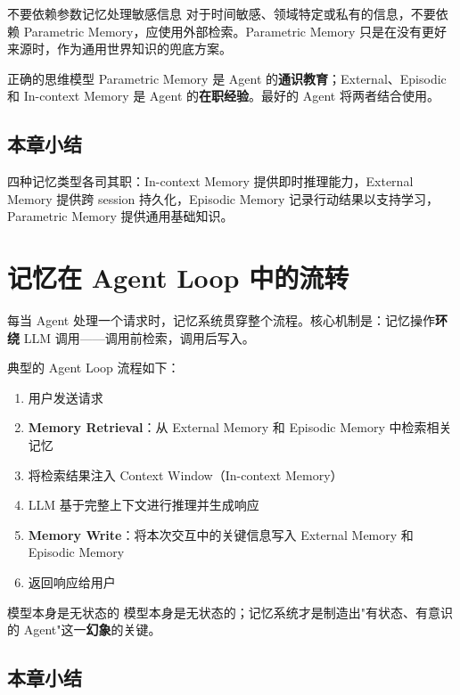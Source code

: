 \documentclass[a4paper]{article}
\begin{document}
\begin{warningbox}{不要依赖参数记忆处理敏感信息}
对于时间敏感、领域特定或私有的信息，不要依赖 Parametric Memory，应使用外部检索。Parametric Memory 只是在没有更好来源时，作为通用世界知识的兜底方案。
\end{warningbox}

\begin{importantbox}{正确的思维模型}
Parametric Memory 是 Agent 的\textbf{通识教育}；External、Episodic 和 In-context Memory 是 Agent 的\textbf{在职经验}。最好的 Agent 将两者结合使用。
\end{importantbox}

\subsection{本章小结}

四种记忆类型各司其职：In-context Memory 提供即时推理能力，External Memory 提供跨 session 持久化，Episodic Memory 记录行动结果以支持学习，Parametric Memory 提供通用基础知识。

\section{记忆在 Agent Loop 中的流转}

每当 Agent 处理一个请求时，记忆系统贯穿整个流程。核心机制是：记忆操作\textbf{环绕} LLM 调用——调用前检索，调用后写入。

典型的 Agent Loop 流程如下：

\begin{enumerate}[leftmargin=2em]
    \item 用户发送请求
    \item \textbf{Memory Retrieval}：从 External Memory 和 Episodic Memory 中检索相关记忆
    \item 将检索结果注入 Context Window（In-context Memory）
    \item LLM 基于完整上下文进行推理并生成响应
    \item \textbf{Memory Write}：将本次交互中的关键信息写入 External Memory 和 Episodic Memory
    \item 返回响应给用户
\end{enumerate}

\begin{importantbox}{模型本身是无状态的}
模型本身是无状态的；记忆系统才是制造出"有状态、有意识的 Agent"这一\textbf{幻象}的关键。
\end{importantbox}

\subsection{本章小结}
\end{document}
